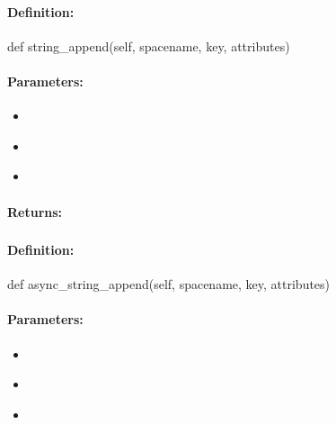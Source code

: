 \paragraph{Definition:}
\begin{pythoncode}
def string_append(self, spacename, key, attributes)
\end{pythoncode}

\paragraph{Parameters:}
\begin{itemize}[noitemsep]
\item {}\\

\item {}\\

\item {}\\

\end{itemize}

\paragraph{Returns:}


\pagebreak
\subsubsection{}
\label{api:python:async_string_append}


\paragraph{Definition:}
\begin{pythoncode}
def async_string_append(self, spacename, key, attributes)
\end{pythoncode}

\paragraph{Parameters:}
\begin{itemize}[noitemsep]
\item {}\\

\item {}\\

\item {}\\

\end{itemize}

